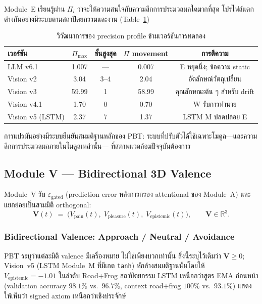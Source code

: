 \documentclass[12pt,a4paper]{article}
\newcommand{\vpain}{V_{\mathrm{pain}}}
\newcommand{\vpleasure}{V_{\mathrm{pleasure}}}
\newcommand{\vepi}{V_{\mathrm{epistemic}}}
\begin{document}
Module~E เรียนรู้ผ่าน $\Pi_l$ ว่าจะให้ความสนใจกับความลึกการประมวลผลใดมากที่สุด
โปรไฟล์แตกต่างกันอย่างมีระบบตามสถาปัตยกรรมและงาน
(Table~\ref{tab:precision_profile})

\begin{table}[!htbp]
\centering
\caption{วิวัฒนาการของ precision profile ข้ามเวอร์ชันการทดลอง}
\label{tab:precision_profile}
\small
\begin{tabular}{@{}lcccc@{}}
\toprule
\textbf{เวอร์ชัน} & $\Pi_{\max}$ & \textbf{ชั้นสูงสุด}
  & $\Pi$ movement & \textbf{การตีความ} \\
\midrule
LLM v6.1          & 1.007 & ---   & 0.007  & E หยุดนิ่ง; ข้อความ static \\
Vision v2          & 3.04  & 3--4  & 2.04   & อัตลักษณ์วัตถุเปลี่ยน \\
Vision v3          & 59.99 & 1     & 58.99  & คุณลักษณะต้น ๆ สำหรับ drift \\
Vision v4.1        & 1.70  & 0     & 0.70   & W รับการทำนาย \\
Vision v5 (LSTM)   & 2.37  & 7     & 1.37   & LSTM M ปลดปล่อย E \\
\bottomrule
\end{tabular}
\end{table}

การแปรผันอย่างมีระบบยืนยันสมมติฐานหลักของ PBT:
ระบบที่ปรับตัวได้ใช้เฉพาะโมดูล---และความลึกการประมวลผลภายในโมดูลเหล่านั้น---
ที่สภาพแวดล้อมปัจจุบันต้องการ

\subsection{Module V --- Bidirectional 3D Valence}

Module~V รับ $\varepsilon_{\mathrm{gated}}$ (prediction error หลังการกรอง
attentional ของ Module~A) และแยกย่อยเป็นสามมิติ orthogonal:
\begin{equation}
  \mathbf{V}(t) \;=\; \bigl(\vpain(t),\;\vpleasure(t),\;\vepi(t)\bigr),
  \qquad \mathbf{V}\in\mathbb{R}^3.
  \label{eq:valence}
\end{equation}

\subsubsection{Bidirectional Valence: Approach / Neutral / Avoidance}

PBT ระบุว่าแต่ละมิติ valence มีเครื่องหมาย ไม่ใช่เพียงบวกเท่านั้น
สิ่งนี้ระบุไว้เดิมว่า $\mathbf{V}\ge 0$; Vision~v5 (LSTM Module~M
ที่มีเกต \texttt{tanh}) หักล้างสมมติฐานนั้นโดยให้
$\vepi = -1.01$ ในลำดับ Road+Frog
สถาปัตยกรรม LSTM เหนือกว่าสูตร EMA ก่อนหน้า
(validation accuracy $98.1\%$ vs.\ $96.7\%$, context road+frog $100\%$ vs.\ $93.1\%$)
แสดงให้เห็นว่า signed axiom เหนือกว่าเชิงประจักษ์
\end{document}
